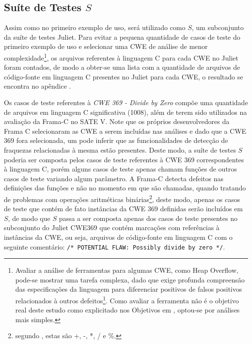 \subsection{Suíte de Testes $S$}

Assim como no primeiro exemplo de uso, será utilizado como $S$, um subconjunto da suíte de testes Juliet. Para evitar a pequena quantidade de casos de teste do primeiro exemplo de uso e selecionar uma CWE de análise de menor complexidade\footnote{Avaliar a análise de ferramentas para algumas CWE, como Heap Overflow, pode-se mostrar uma tarefa complexa, dado que exige profunda compreensão das especificações da linguagem para diferenciar positivos de falsos positivos relacionados à outros defeitos\footnote{Embora o Juliet apresente apenas 1 defeito por caso de teste, uma ferramenta pode apontar, por exemplo, um defeito relacionado à outra classe de fraquezas no mesmo ponto de entrada do defeito apresentado em um caso de testes, não gerando um positivo para o defeito relevante à análise}. Como avaliar a ferramenta não é o objetivo real deste estudo como explicitado nos Objetivos em , optou-se por análises mais simples.}, os arquivos referentes à linguagem C para cada CWE no Juliet foram contados, de modo a obter-se uma lista com a quantidade de arquivos de código-fonte em linguagem C presentes no Juliet para cada CWE, o resultado se encontra no apêndice .

Os casos de teste referentes à \textit{CWE 369 - Divide by Zero} compõe uma quantidade de arquivos em linguagem C significativa (1008), além de terem sido utilizados na avaliação da Frama-C no SATE V. Note que os próprios desenvolvedores da Frama C selecionaram as CWE a serem incluídas nas análises e dado que a CWE 369 fora selecionada, um pode inferir que as funcionalidades de detecção de fraquezas relacionadas à mesma estão presentes. Deste modo, a suíte de testes $S$ poderia ser composta pelos casos de teste referentes à CWE 369 correspondentes à linguagem C, porém alguns casos de teste apenas chamam funções de outros casos de teste variando algum parâmetro.  A Frama-C detecta defeitos nas definições das funções e não no momento em que são chamadas, quando tratando de problemas com operações aritméticas binárias\footnote{segundo \cite{kernighan}, estas são +, -, *, / e \%.}, deste modo, apenas os casos de teste que contém de fato instâncias da CWE 369 definidas serão incluídos em $S$, de modo que  $S$ passa a ser composta apenas dos casos de teste presentes no subconjunto do Juliet CWE369 que contém marcações com referências à instâncias da CWE, ou seja, arquivos de código-fonte em linguagem C com o seguinte comentário:
  \lstinline{/* POTENTIAL FLAW: Possibly divide by zero */}.

